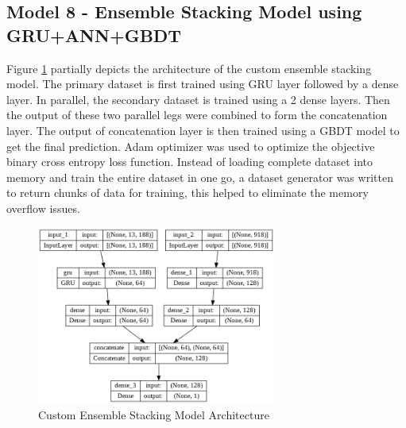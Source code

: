 \documentclass[twoside,11pt,a4paper]{article}
\begin{document}
\subsection{Model 8 - Ensemble Stacking Model using \acs{GRU}+\acs{ANN}+\acs{GBDT}}
Figure \ref{fig:gru_nn_gbdt_arch} partially depicts the architecture of the custom ensemble stacking model. The primary dataset is first trained using \acs{GRU} layer followed by a dense layer. In parallel, the secondary dataset is trained using a 2 dense layers. Then the output of these two parallel legs were combined to form the concatenation layer. The output of concatenation layer is then trained using a  \acs{GBDT} model to get the final prediction. Adam optimizer was used to optimize the objective binary cross entropy loss function. Instead of loading complete dataset into memory and train the entire dataset in one go, a dataset generator was written to return chunks of data for training, this helped to eliminate the memory overflow issues.\\
\begin{figure}[ht]
	\centering
	\includegraphics[width=0.7\textwidth, height=0.3\textheight]{GRU_NN_GBDT_Architecture}
	\caption[Custom Ensemble Stacking Model Architecture]{Custom Ensemble Stacking Model Architecture}
	\label{fig:gru_nn_gbdt_arch}
\end{figure}
\FloatBarrier
\end{document}
